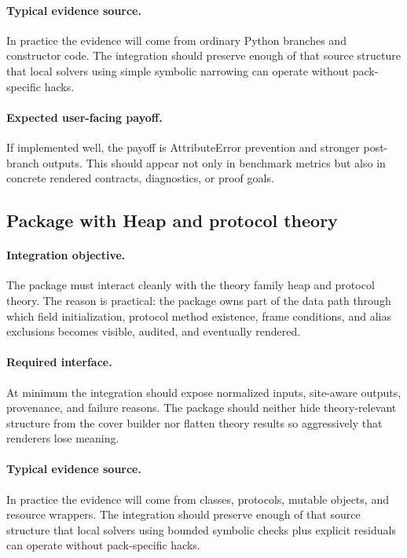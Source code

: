\documentclass[11pt]{report}
\DeclareRobustCommand{\py}[1]{\texttt{\detokenize{#1}}}
\theoremstyle{definition}
\theoremstyle{plain}
\begin{document}
\paragraph{Typical evidence source.}
In practice the evidence will come from ordinary Python branches and constructor code. The integration should
preserve enough of that source structure that local solvers using simple symbolic narrowing
can operate without pack-specific hacks.

\paragraph{Expected user-facing payoff.}
If implemented well, the payoff is AttributeError prevention and stronger post-branch outputs. This should appear not only
in benchmark metrics but also in concrete rendered contracts,
diagnostics, or proof goals.


\subsection{Package \py{src/deppy/assist} with Heap and protocol theory}

\paragraph{Integration objective.}
The package \py{src/deppy/assist} must interact cleanly with the
theory family heap and protocol theory. The reason is practical: the
package owns part of the data path through which field initialization, protocol method existence, frame conditions, and alias exclusions becomes
visible, audited, and eventually rendered.

\paragraph{Required interface.}
At minimum the integration should expose normalized inputs, site-aware
outputs, provenance, and failure reasons. The package should neither hide
theory-relevant structure from the cover builder nor flatten theory
results so aggressively that renderers lose meaning.

\paragraph{Typical evidence source.}
In practice the evidence will come from classes, protocols, mutable objects, and resource wrappers. The integration should
preserve enough of that source structure that local solvers using bounded symbolic checks plus explicit residuals
can operate without pack-specific hacks.
\end{document}
